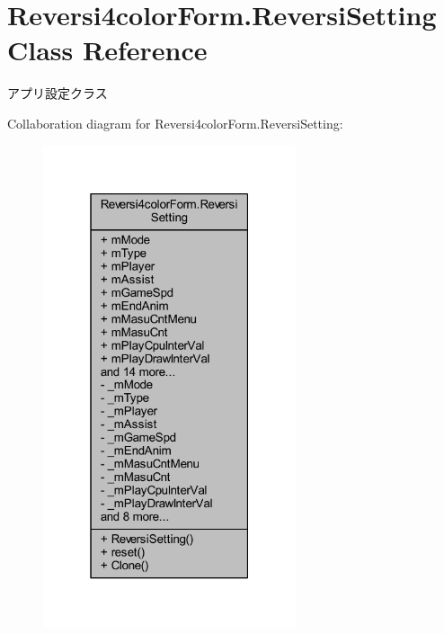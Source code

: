 \hypertarget{class_reversi4color_form_1_1_reversi_setting}{}\section{Reversi4color\+Form.\+Reversi\+Setting Class Reference}
\label{class_reversi4color_form_1_1_reversi_setting}


アプリ設定クラス  




Collaboration diagram for Reversi4color\+Form.\+Reversi\+Setting\+:\nopagebreak
\begin{figure}[H]
\begin{center}
\leavevmode
\includegraphics[width=211pt]{class_reversi4color_form_1_1_reversi_setting__coll__graph}
\end{center}
\end{figure}
